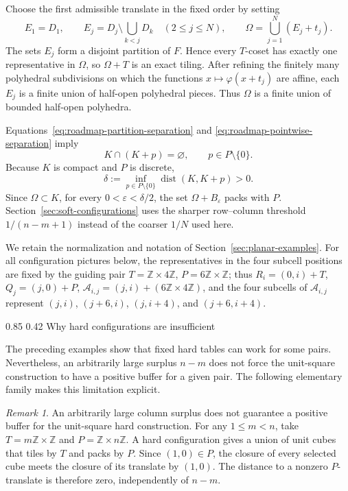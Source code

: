 \documentclass[11pt,reqno]{amsart}
\makeatletter
\numberwithin{equation}{section}
\renewcommand\subsection{\@startsection{subsection}{2}{\z@}%
  {0.85\baselineskip \@plus 0.25\baselineskip \@minus 0.10\baselineskip}%
  {0.42\baselineskip}%
  {\normalfont\bfseries}}
\theoremstyle{definition}
\theoremstyle{remark}
\newtheorem{remark}[theorem]{Remark}
\newcommand{\Z}{\mathbb Z}
\newcommand{\dist}{\operatorname{dist}}
\makeatother
\begin{document}
Choose the first admissible translate in the fixed order by setting
\begin{equation}\label{eq:finite-roadmap-first-hit}
 E_1=D_1,
 \qquad
 E_j=D_j\setminus\bigcup_{k<j}D_k\quad (2\le j\le N),
 \qquad
 \Omega=\bigcup_{j=1}^N(E_j+t_j).
\end{equation}
The sets $E_j$ form a disjoint partition of $F$.  Hence every $T$-coset has
exactly one representative in $\Omega$, so $\Omega+T$ is an exact tiling.
After refining the finitely many polyhedral subdivisions on which the
functions $x\mapsto\varphi(x+t_j)$ are affine, each $E_j$ is a finite union
of half-open polyhedral pieces.  Thus $\Omega$ is a finite union of bounded
half-open polyhedra.

Equations~\eqref{eq:roadmap-partition-separation} and
\eqref{eq:roadmap-pointwise-separation} imply
\[
 K\cap(K+p)=\varnothing,
 \qquad p\in P\setminus\{0\}.
\]
Because $K$ is compact and $P$ is discrete,
\[
 \delta:=\inf_{p\in P\setminus\{0\}}\dist(K,K+p)>0.
\]
Since $\Omega\subset K$, for every $0<\varepsilon<\delta/2$, the set
$\Omega+B_\varepsilon$ packs with $P$.  Section~\ref{sec:soft-configurations}
uses the sharper row--column threshold $1/(n-m+1)$ instead of the coarser
$1/N$ used here.

We retain the normalization and notation of
Section~\ref{sec:planar-examples}.  For all configuration pictures below, the representatives in the four subcell positions are fixed by the guiding pair $T=\Z\times4\Z$, $P=6\Z\times\Z$; thus
$R_i=(0,i)+T$, $Q_j=(j,0)+P$,
$\mathcal A_{i,j}=(j,i)+(6\Z\times4\Z)$, and the four subcells of
$\mathcal A_{i,j}$ represent $(j,i)$, $(j+6,i)$, $(j,i+4)$, and
$(j+6,i+4)$.

\subsection{Why hard configurations are insufficient}

The preceding examples show that fixed hard tables can work for some pairs.  Nevertheless, an arbitrarily large surplus $n-m$ does not force the unit-square construction to have a positive buffer for a given pair.  The following elementary family makes this limitation explicit.

\begin{remark}\label{prop:hard-not-enough}
An arbitrarily large column surplus does not guarantee a positive buffer for
the unit-square hard construction.
For any $1\le m<n$, take $T=m\Z\times\Z$ and
$P=\Z\times n\Z$.  A hard configuration gives a union of unit cubes that
tiles by $T$ and packs by $P$.  Since $(1,0)\in P$, the closure of every
selected cube meets the closure of its translate by $(1,0)$.  The distance
to a nonzero $P$-translate is therefore zero, independently of $n-m$.
\end{remark}
\end{document}
